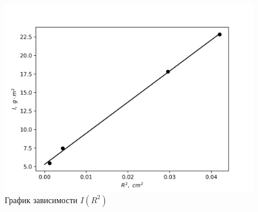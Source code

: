 \documentclass[14pt, a4paper]{article}
\begin{document}
\begin{figure}
\includegraphics[width=\linewidth]{laba3_2.png}
\caption{График зависимости $I(R^2)$}
\label{image2}
\end{figure}
\end{document}
